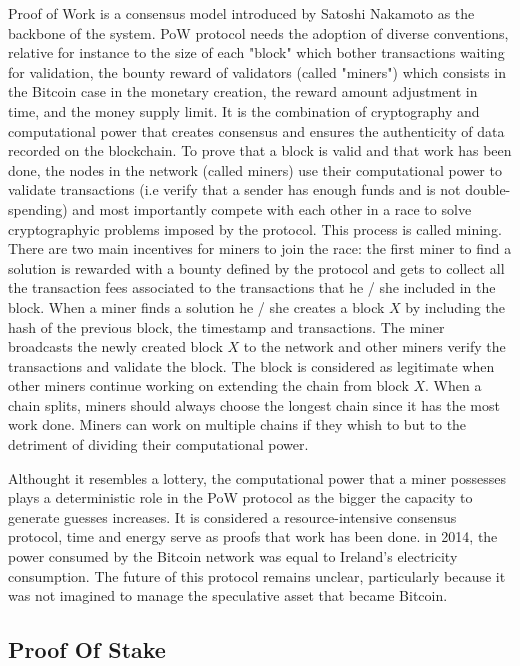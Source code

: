 \documentclass{article}
\begin{document}
Proof of Work is a consensus model introduced by Satoshi Nakamoto as the backbone of the system. PoW protocol needs the adoption of diverse conventions, relative for instance to the size of each "block" which bother transactions waiting for validation, the bounty reward of validators (called "miners") which consists in the Bitcoin case in the monetary creation, the reward amount adjustment in time, and the money supply limit. It is the combination of cryptography and computational power that creates consensus and ensures the authenticity of data recorded on the blockchain. To prove that a block is valid and that work has been done, the nodes in the network (called miners) use their computational power to validate transactions (i.e verify that a sender has enough funds and is not double-spending) and most importantly compete with each other in a race to solve cryptographyic problems imposed by the protocol. This process is called mining. There are two main incentives for miners to join the race: the first miner to find a solution is rewarded with a bounty defined by the protocol and gets to collect all the transaction fees associated to the transactions that he / she included in the block. When a miner finds a solution he / she creates a block $X$ by including the hash of the previous block, the timestamp and transactions. The miner broadcasts the newly created block $X$ to the network and other miners verify the transactions and validate the block. The block is considered as legitimate when other miners continue working on extending the chain from block $X$. When a chain splits, miners should always choose the longest chain since it has the most work done. Miners can work on multiple chains if they whish to but to the detriment of dividing their computational power. \newline

Althought it resembles a lottery, the computational power that a miner possesses plays a deterministic role in the PoW protocol as the bigger the capacity to generate guesses increases. It is considered a resource-intensive consensus protocol, time and energy serve as proofs that work has been done. in 2014, the power consumed by the Bitcoin network was equal to Ireland's electricity consumption. The future of this protocol remains unclear, particularly because it was not imagined to manage the speculative asset that became Bitcoin.



\subsection{Proof Of Stake} 
\end{document}
